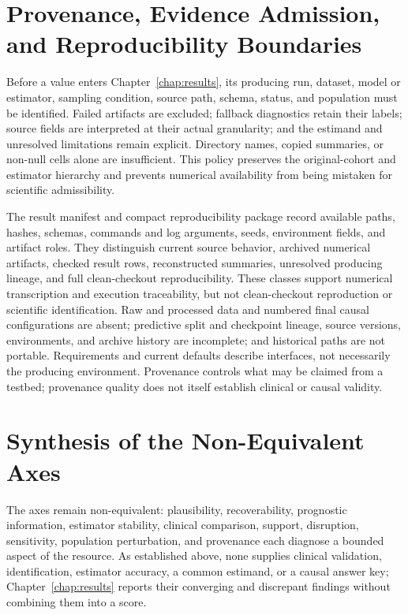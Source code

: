 \section{Provenance, Evidence Admission, and Reproducibility Boundaries}
\label{sec:experimental-design:evaluation-result-selection-policy}

Before a value enters Chapter~\ref{chap:results}, its producing run, dataset, model or estimator, sampling condition, source path, schema, status, and population must be identified.  Failed artifacts are excluded; fallback diagnostics retain their labels; source fields are interpreted at their actual granularity; and the estimand and unresolved limitations remain explicit.  Directory names, copied summaries, or non-null cells alone are insufficient.  This policy preserves the original-cohort and estimator hierarchy and prevents numerical availability from being mistaken for scientific admissibility.

\label{sec:experimental-design:computational-environment-reproducibility}
The result manifest and compact reproducibility package record available paths, hashes, schemas, commands and log arguments, seeds, environment fields, and artifact roles.  They distinguish current source behavior, archived numerical artifacts, checked result rows, reconstructed summaries, unresolved producing lineage, and full clean-checkout reproducibility.  These classes support numerical transcription and execution traceability, but not clean-checkout reproduction or scientific identification.  Raw and processed data and numbered final causal configurations are absent; predictive split and checkpoint lineage, source versions, environments, and archive history are incomplete; and historical paths are not portable.  Requirements and current defaults describe interfaces, not necessarily the producing environment.  Provenance controls what may be claimed from a testbed; provenance quality does not itself establish clinical or causal validity.

\section{Synthesis of the Non-Equivalent Axes}

The axes remain non-equivalent: plausibility, recoverability, prognostic information, estimator stability, clinical comparison, support, disruption, sensitivity, population perturbation, and provenance each diagnose a bounded aspect of the resource.  As established above, none supplies clinical validation, identification, estimator accuracy, a common estimand, or a causal answer key; Chapter~\ref{chap:results} reports their converging and discrepant findings without combining them into a score.

